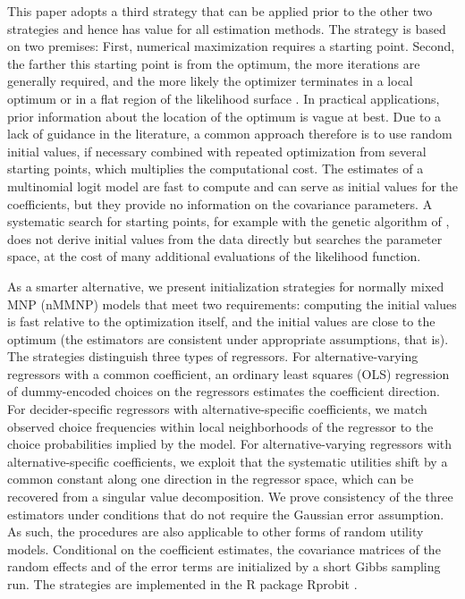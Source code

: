 \documentclass[preprint,12pt,authoryear]{elsarticle}
\begin{document}
This paper adopts a third strategy that can be applied prior to the other two strategies and hence has value for all estimation methods. The strategy is based on two premises: First, numerical maximization %
requires a starting point. Second, the farther this starting point is from the optimum, the more iterations are generally required, and the more likely the optimizer terminates in a local optimum or in a flat region of the likelihood surface \citep{Nocedal2006}. In practical applications, prior information about the location of the optimum is vague at best. Due to a lack of guidance in the literature, a common approach therefore is to use random initial values, if necessary combined with repeated optimization from several starting points, which multiplies the computational cost. The estimates of a multinomial logit model are fast to compute and can serve as initial values for the coefficients, but they provide no information on the covariance parameters. A systematic search for starting points, for example with the genetic algorithm of \citet{Liu2000}, does not derive initial values from the data directly but searches the parameter space, at the cost of many additional evaluations of the likelihood function.

As a smarter alternative, we present initialization strategies for normally mixed MNP (nMMNP) models that meet two requirements: computing the initial values is fast relative to the optimization itself, and the initial values are close to the optimum (the estimators are consistent under appropriate assumptions, that is). The strategies distinguish three types of regressors. For alternative-varying regressors with a common coefficient, an ordinary least squares (OLS) regression of dummy-encoded choices on the regressors %
estimates the coefficient direction. For decider-specific regressors with alternative-specific coefficients, we match observed choice frequencies within local neighborhoods of the regressor to the choice probabilities implied by the model. For alternative-varying regressors with alternative-specific coefficients, we exploit that the systematic utilities shift by a common constant along one direction in the regressor space, which can be recovered from a singular value decomposition. We prove consistency of the three estimators under conditions that do not require the Gaussian error assumption. As such, the procedures are also applicable to other forms of random utility models. Conditional on the coefficient estimates, the covariance matrices of the random effects and of the error terms are initialized by a short Gibbs sampling run. The strategies are implemented in the R package Rprobit \citep{Rprobit}.
\end{document}
